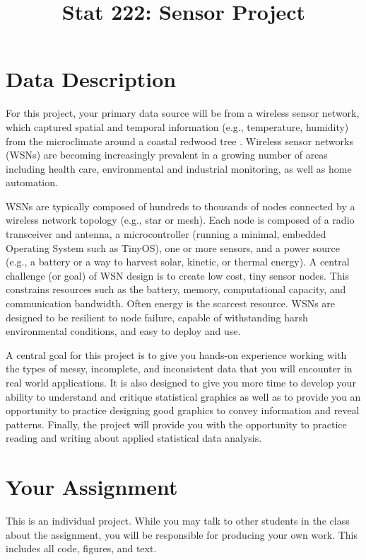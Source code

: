 \documentclass[11pt, oneside]{article}   	%
\title{Stat 222: Sensor Project}
\date{}							%
\begin{document}
\maketitle

\section{Data Description}

For this project, your primary data source will be from a wireless sensor
network, which captured spatial and temporal information (e.g., temperature,
humidity) from the microclimate around a coastal redwood tree
\cite{tolle2005macroscope, yang2003redwoods}.  Wireless sensor networks (WSNs)
are becoming increasingly prevalent in a growing number of areas including
health care, environmental and industrial monitoring, as well as home
automation.

WSNs are typically composed of hundreds to thousands of nodes connected by a
wireless network topology (e.g., star or mesh).  Each node is composed of a
radio transceiver and antenna, a microcontroller (running a minimal, embedded
Operating System such as TinyOS), one or more sensors, and a power source
(e.g., a battery or a way to harvest solar, kinetic, or thermal energy).  A
central challenge (or goal) of WSN design is to create low cost, tiny sensor
nodes.  This constrains resources such as the battery, memory, computational
capacity, and communication bandwidth.  Often energy is the scarcest resource.
WSNs are designed to be resilient to node failure, capable of withstanding
harsh environmental conditions, and easy to deploy and use. 

A central goal for this project is to give you hands-on experience working
with the types of messy, incomplete, and inconsistent data that you will
encounter in real world applications.  It is also designed to give you more
time to develop your ability to understand and critique statistical graphics as
well as to provide you an opportunity to practice designing good graphics to
convey information and reveal patterns.  Finally, the project will provide you
with the opportunity to practice reading and writing about applied statistical
data analysis.


\section{Your Assignment}

This is an individual project.  While you may talk to other students in the
class about the assignment, you will be responsible for producing your own
work.  This includes all code, figures, and text.
\end{document}
